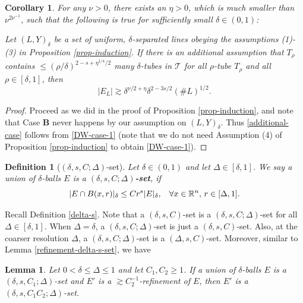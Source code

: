 \documentclass{amsart}
\numberwithin{equation}{section}
\newtheorem{lemma}[theorem]{Lemma}
\newtheorem{definition}[theorem]{Definition}
\newtheorem{corollary}[theorem]{Corollary}
\newcommand{\de}{\delta}
\newcommand{\De}{\Delta}
\newcommand{\ZR}{\mathbb{R}}
\newcommand{\cT}{{\mathcal T}}
\begin{document}
\begin{corollary}
\label{cor-induction}
For any $\nu>0$, there exists an $\eta>0$, which is much smaller than $\nu^{2\nu^{-1}}$, such that the following is true for sufficiently small $\de\in(0,1)$:

Let $(L,Y)_\de$ be a set of uniform, $\de$-separated lines obeying the assumptions (1)-(3) in Proposition \ref{prop-induction}.
If there is an additional assumption that  $T_\rho$ contains $\leq (\rho/\de)^{2-s+\eta^{1/4}/2}$ many $\de$-tubes in $\cT$ for all $\rho$-tube $T_\rho$ and all $\rho\in[\de,1]$, then
\begin{equation}
\label{additional-case}
    |E_L|\gtrsim \de^{\nu/2+\eta}\de^{2-3s/2}(\# L)^{1/2}.
\end{equation}
\end{corollary}
\begin{proof}

Proceed as we did in the proof of Proposition \ref{prop-induction}, and note that Case {\bf B} never happens by our assumption on $(L,Y)_\de$.
Thus \eqref{additional-case} follows from \eqref{DW-case-1} (note that we do not need  Assumption (4) of Proposition \ref{prop-induction} to obtain \eqref{DW-case-1}).
\end{proof}


\smallskip



\begin{definition}[$(\de,s,C; \De)$-set]
\label{delta-s-Delta}
Let $\de\in(0,1)$ and let $\De\in[\de,1]$.
We say a union of $\de$-balls $E$ is a {\bf $(\de,s,C; \De)$-set}, if 
\begin{equation}
    |E\cap B(x,r)|_\de\leq Cr^s|E|_\de, \hspace{.3cm}\forall x \in\ZR^n, \,r\in[\De,1].
\end{equation}
\end{definition}

Recall Definition \ref{delta-s}.
Note that a $(\de,s,C)$-set is a $(\de,s,C;\De)$-set for all $\De\in[\de,1]$.
When $\De=\de$, a $(\de,s,C;\De)$-set is just a $(\de,s,C)$-set.
Also, at the coarser resolution $\De$, a $(\de,s,C;\De)$-set is a $(\De,s,C)$-set.
Moreover, similar to Lemma \ref{refinement-delta-s-set}, we have
\begin{lemma}
\label{refinement-delta-s-Delta-set}
Let $0<\de\leq\De\leq1$ and let $C_1, C_2\geq1$.
If a union of $\de$-balls $E$ is a $(\de,s, C_1;\De)$-set and $E'$ is a $\gtrsim C_2^{-1}$-refinement of $E$, then $E'$ is a $(\de,s, C_1C_2;\De)$-set. 
\end{lemma}
\end{document}
